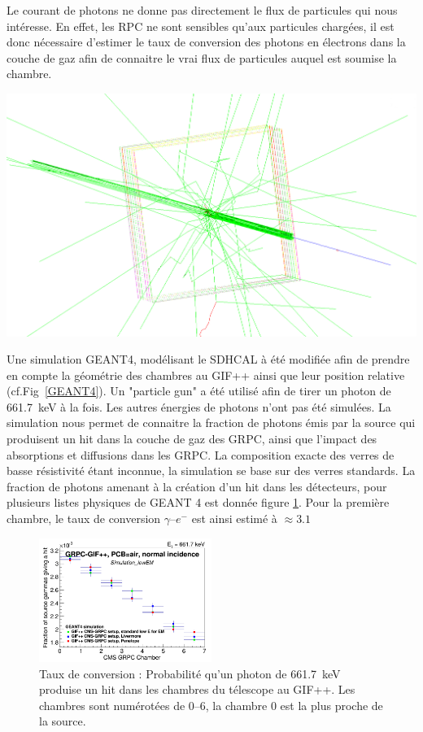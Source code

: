Le courant de photons ne donne pas directement le flux de particules qui nous intéresse. En effet, les RPC ne sont sensibles qu'aux particules chargées, il est donc nécessaire d'estimer le taux de conversion des photons en électrons dans la couche de gaz afin de connaitre le vrai flux de particules auquel est soumise la chambre. 


\marginpar
{
	\centering
	\includegraphics[width=\marginparwidth]{GLA/geant4.png}
	\label{GEANT4}
}

Une simulation GEANT4, modélisant le SDHCAL à été modifiée afin de prendre en compte la géométrie des chambres au GIF++ ainsi que leur position relative (cf.Fig~\ref{GEANT4}). Un "particle gun" a été utilisé afin de tirer un photon de \SI{661.7}{\kilo\eV} à la fois. Les autres énergies de photons n'ont pas été simulées. La simulation nous permet de connaitre la fraction de photons émis par la source qui produisent un hit dans la couche de gaz des GRPC, ainsi que l'impact des absorptions et diffusions dans les GRPC. La composition exacte des verres de basse résistivité étant inconnue, la simulation se base sur des verres standards. La fraction de photons amenant à la création d'un hit dans les détecteurs, pour plusieurs listes physiques de GEANT 4 est donnée figure \ref{conversion}. Pour la première chambre, le taux de conversion $\gamma$--$e^{-}$ est ainsi estimé à $\approx\num{3.1}$\textperthousand

\begin{figure}[!ht]
	\centering
	\includegraphics[width=0.50\textwidth]{GLA/taux.png}
	\caption{Taux de conversion : Probabilité qu'un photon de \SI{661.7}{\kilo\eV} produise un hit dans les chambres du télescope au GIF++. Les chambres sont numérotées de \SIrange{0}{6}{}, la chambre \num{0} est la plus proche de la source.}
	\label{conversion}
\end{figure}

